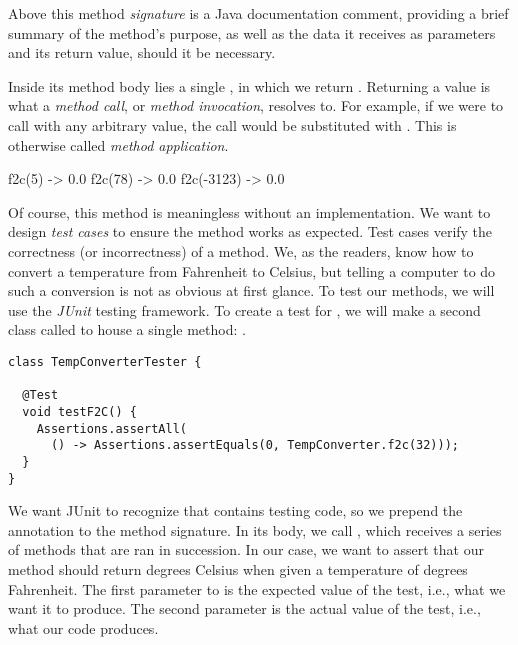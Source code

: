 Above this method \emph{signature} is a Java documentation comment, providing a brief summary of the method's purpose, as well as the data it receives as parameters and its return value, should it be necessary. 

Inside its method body lies a single , in which we return . Returning a value is what a \emph{method call}, or \emph{method invocation}, resolves to. For example, if we were to call  with any arbitrary  value, the call would be substituted with . This is otherwise called \emph{method application}.

\begin{verbnobox}[\small]
f2c(5)     -> 0.0
f2c(78)    -> 0.0
f2c(-3123) -> 0.0
\end{verbnobox}

Of course, this method is meaningless without an implementation. We want to design \emph{test cases} to ensure the method works as expected. Test cases verify the correctness (or incorrectness) of a method. We, as the readers, know how to convert a temperature from Fahrenheit to Celsius, but telling a computer to do such a conversion is not as obvious at first glance. To test our methods, we will use the \emph{JUnit} testing framework. To create a test for , we will make a second class called  to house a single method: .

\begin{lstlisting}[language=MyJava]
class TempConverterTester {

  @Test
  void testF2C() {
    Assertions.assertAll(
      () -> Assertions.assertEquals(0, TempConverter.f2c(32)));
  }
}
\end{lstlisting}

We want JUnit to recognize that  contains testing code, so we prepend the  annotation to the method signature. In its body, we call , which receives a series of methods that are ran in succession. In our case, we want to assert that our  method should return  degrees Celsius when given a temperature of  degrees Fahrenheit. The first parameter to  is the expected value of the test, i.e., what we want it to produce. The second parameter is the actual value of the test, i.e., what our code produces. 

